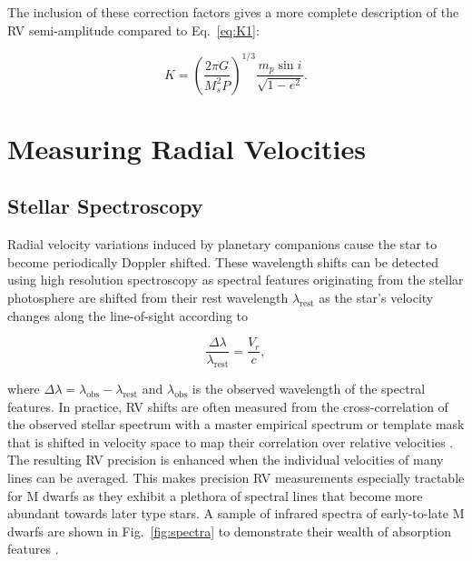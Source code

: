 The inclusion of these correction factors gives a more complete description of the RV semi-amplitude
compared to Eq.~\ref{eq:K1}: 

\begin{equation}
K = \left( \frac{2\pi G}{M_s^2 P} \right)^{1/3} \frac{m_p \sin{i}}{\sqrt{1-e^2}}. 
\label{eq:K2}
\end{equation}

\section{Measuring Radial Velocities} \label{sect:spectrograph}
\subsection{Stellar Spectroscopy}
Radial velocity variations induced by planetary companions cause the star to become 
periodically Doppler shifted. These wavelength shifts can be detected using high resolution 
spectroscopy as spectral features originating from the stellar photosphere are shifted from
their rest wavelength $\lambda_{\text{rest}}$ as the star's velocity changes along the
line-of-sight according to 

\begin{equation}
\frac{\Delta \lambda}{\lambda_{\text{rest}}} = \frac{V_r}{c},
\end{equation}

\noindent where $\Delta \lambda = \lambda_{\text{obs}}-\lambda_{\text{rest}}$ and
$\lambda_{\text{obs}}$ is the observed wavelength of the spectral features. 
In practice, RV shifts are often measured from the cross-correlation of 
the observed stellar spectrum with a master empirical spectrum or template mask
that is shifted in velocity space to map their correlation over relative velocities
\citep{astudillodefru15}. The resulting RV precision is enhanced when the individual velocities
of many lines can be averaged. This makes precision RV measurements especially tractable for M
dwarfs as they exhibit a plethora of 
spectral lines that become more abundant towards later type stars.
A sample of infrared spectra of early-to-late M dwarfs 
are shown in Fig.~\ref{fig:spectra} to demonstrate their wealth of absorption features
\citep{rayner09}.  \\

